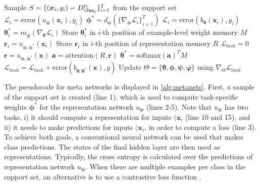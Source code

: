 \begin{algorithm}
\caption{Meta networks, by }\label{alg:metanets}
\begin{algorithmic}[1]
\State Sample $S = \{ (\boldsymbol{x}_{i},y_{i}) \backsim D^{tr}_{\Tau_{j}} \}_{i=1}^{T}$ from the support set
    \State $\mathcal{L}_{i} = \mbox{error}(u_{\boldsymbol{\phi}}(\boldsymbol{x}_{i}), y_{i})$ 
\EndFor
\State $\boldsymbol{\phi}^{*} = d_{\boldsymbol{\psi}}(\{ \nabla_{\boldsymbol{\phi}} \mathcal{L}_{i} \}_{i=1}^{T})$
    \State $\mathcal{L}_{i} = \mbox{error}(b_{\boldsymbol{\theta}}(\boldsymbol{x}_{i}),y_{i})$
    \State $\boldsymbol{\theta}_{i}^{*} = m_{\boldsymbol{\varphi}}(\nabla_{\boldsymbol{\theta}}\mathcal{L}_{i})$
    \State Store $\boldsymbol{\theta}_{i}^{*}$ in $i$-th position of example-level weight memory $M$
    \State $\boldsymbol{r}_{i} = u_{\boldsymbol{\phi}, \boldsymbol{\phi}^{*}}(\boldsymbol{x}_{i})$
    \State Store $\boldsymbol{r}_{i}$ in $i$-th position of representation memory $R$
\EndFor
\State $\mathcal{L}_{task} = 0$
    \State $\boldsymbol{r} = u_{\boldsymbol{\phi}, \boldsymbol{\phi}^{*}}(\boldsymbol{x})$
    \State $\boldsymbol{a} = \mbox{attention}(R, \boldsymbol{r})$ 
    \State $\boldsymbol{\theta}^{*} = \mbox{softmax}(\boldsymbol{a})^{T}M$
    \State $\mathcal{L}_{task} = \mathcal{L}_{task} + \mbox{error}(b_{\boldsymbol{\theta}, \boldsymbol{\theta}^{*}}(\boldsymbol{x}), y)$
\EndFor
\State Update $\Theta = \{ \boldsymbol{\theta}, \boldsymbol{\phi}, \boldsymbol{\psi}, \boldsymbol{\varphi} \}$ using $\nabla_{\Theta} \mathcal{L}_{task}$
\end{algorithmic}
\end{algorithm}
The pseudocode for meta networks is displayed in \autoref{alg:metanets}. First, a sample of the support set is created (line 1), which is used to compute task-specific weights $\boldsymbol{\phi}^{*}$ for the representation network $u_{\boldsymbol{\phi}}$ (lines 2-5). 
Note that  $u_{\boldsymbol{\phi}}$ has two tasks, i) it should compute a representation for inputs $(\boldsymbol{x}_{i}$ (line 10 and 15), and ii) it needs to make predictions for inputs $(\boldsymbol{x}_{i}$, in order to compute a loss (line 3). 
To achieve both goals, a conventional neural network can be used that makes class predictions. The states of the final hidden layer are then used as representations. 
Typically, the cross entropy is calculated over the predictions of representation network $u_{\boldsymbol{\phi}}$. When there are multiple examples per class in the support set, an alternative is to use a contrastive loss function . 
